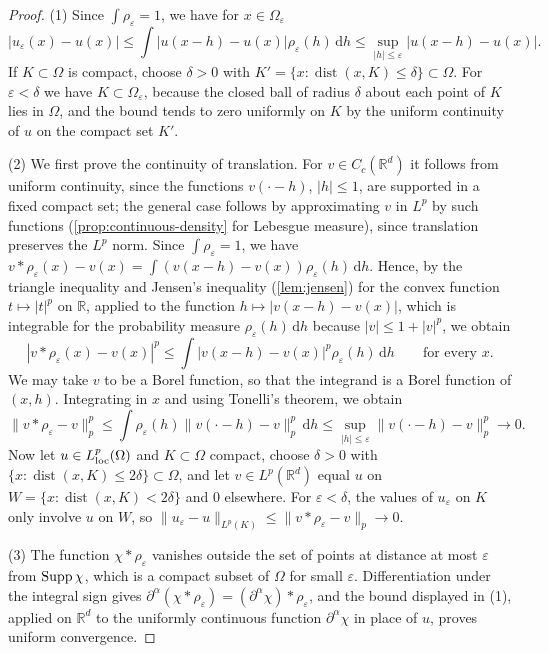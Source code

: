 \begin{proof}
(1) Since $\int\rho_\varepsilon=1$, we have for $x\in\Omega_\varepsilon$
\[
 |u_\varepsilon(x)-u(x)|\leq\int|u(x-h)-u(x)|\rho_\varepsilon(h)\,\mathrm dh\leq\sup_{|h|\leq\varepsilon}|u(x-h)-u(x)|.
\]
If $K\subset\Omega$ is compact, choose $\delta>0$ with $K'=\{x:\operatorname{dist}(x,K)\leq\delta\}\subset\Omega$. For $\varepsilon<\delta$ we have $K\subset\Omega_\varepsilon$, because the closed ball of radius $\delta$ about each point of $K$ lies in $\Omega$, and the bound tends to zero uniformly on $K$ by the uniform continuity of $u$ on the compact set $K'$.

(2) We first prove the continuity of translation. For $v\in C_c(\mathbb R^d)$ it follows from uniform continuity, since the functions $v(\cdot-h)$, $|h|\leq1$, are supported in a fixed compact set; the general case follows by approximating $v$ in $L^p$ by such functions (\cref{prop:continuous-density} for Lebesgue measure), since translation preserves the $L^p$ norm. Since $\int\rho_\varepsilon=1$, we have $v*\rho_\varepsilon(x)-v(x)=\int(v(x-h)-v(x))\rho_\varepsilon(h)\,\mathrm dh$. Hence, by the triangle inequality and Jensen's inequality (\cref{lem:jensen}) for the convex function $t\mapsto|t|^p$ on $\mathbb R$, applied to the function $h\mapsto|v(x-h)-v(x)|$, which is integrable for the probability measure $\rho_\varepsilon(h)\,\mathrm dh$ because $|v|\leq1+|v|^p$, we obtain
\[
 |v*\rho_\varepsilon(x)-v(x)|^p\leq\int|v(x-h)-v(x)|^p\rho_\varepsilon(h)\,\mathrm dh\qquad\text{for every }x.
\]
We may take $v$ to be a Borel function, so that the integrand is a Borel function of $(x,h)$. Integrating in $x$ and using Tonelli's theorem, we obtain
\[
 \|v*\rho_\varepsilon-v\|_p^p
 \leq\int\rho_\varepsilon(h)\|v(\cdot-h)-v\|_p^p\,\mathrm d h\leq\sup_{|h|\leq\varepsilon}\|v(\cdot-h)-v\|_p^p\to0.
\]
Now let $u\in L^p_{\mathrm{loc}}(\Omega)$ and $K\subset\Omega$ compact, choose $\delta>0$ with $\{x:\operatorname{dist}(x,K)\leq2\delta\}\subset\Omega$, and let $v\in L^p(\mathbb R^d)$ equal $u$ on $W=\{x:\operatorname{dist}(x,K)<2\delta\}$ and $0$ elsewhere. For $\varepsilon<\delta$, the values of $u_\varepsilon$ on $K$ only involve $u$ on $W$, so $\|u_\varepsilon-u\|_{L^p(K)}\leq\|v*\rho_\varepsilon-v\|_p\to0$.

(3) The function $\chi*\rho_\varepsilon$ vanishes outside the set of points at distance at most $\varepsilon$ from $\operatorname{Supp}\chi$, which is a compact subset of $\Omega$ for small $\varepsilon$. Differentiation under the integral sign gives $\partial^\alpha(\chi*\rho_\varepsilon)=(\partial^\alpha\chi)*\rho_\varepsilon$, and the bound displayed in (1), applied on $\mathbb R^d$ to the uniformly continuous function $\partial^\alpha\chi$ in place of $u$, proves uniform convergence.


\end{proof}
